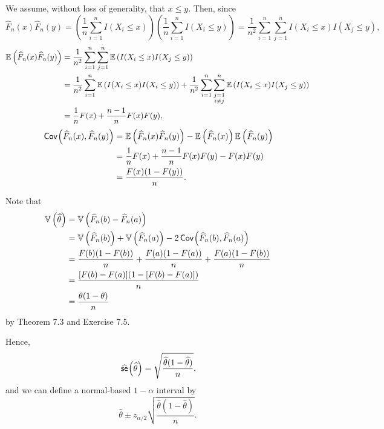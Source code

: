 \begin{ex}
  We assume, without loss of generality, that $x\leq y$. Then, since
  \[
    \widehat{F}_n(x)\widehat{F}_n(y)
    =\left(\frac{1}{n}\sum_{i=1}^nI(X_i\leq x)\right)
    \left(\frac{1}{n}\sum_{i=1}^nI(X_i\leq y)\right)
    =\frac{1}{n^2}\sum_{i=1}^n\sum_{j=1}^nI(X_i\leq x)I(X_j\leq y),
  \]
  \begin{align*}
    \mathbb{E}\left(\widehat{F}_n(x)\widehat{F}_n(y)\right)
     & =\frac{1}{n^2}
    \sum_{i=1}^n\sum_{j=1}^n\mathbb{E}\left(I(X_i\leq x)I(X_j\leq y)\right)      \\
     & =\frac{1}{n^2}\sum_{i=1}^n\mathbb{E}\left(I(X_i\leq x)I(X_i\leq y)\right)
    +\frac{1}{n^2}\sum_{i=1}^n\sum_{\substack{j=1             \\ i\neq j}}^n\mathbb{E}\left(I(X_i\leq x)I(X_j\leq y)\right) \\
     & =\frac{1}{n}F(x)+\frac{n-1}{n}F(x)F(y),
  \end{align*}
  \begin{align*}
    \,\textsf{Cov}\mkern-2mu\left(\widehat{F}_n(x),\widehat{F}_n(y) \right)
     & =\mathbb{E}\left(\widehat{F}_n(x)\widehat{F}_n(y)\right)
    -\mathbb{E}\left(\widehat{F}_n(x)\right)\mathbb{E}\left(\widehat{F}_n(y)\right) \\
     & =\frac{1}{n}F(x)+\frac{n-1}{n}F(x)F(y)
    -F(x)F(y)                                 \\
     & =\frac{F(x)(1-F(y))}{n}.
  \end{align*}
\end{ex}

\begin{ex}
  Note that
  \begin{align*}
    \mathbb{V}\left(\widehat{\theta}\right)
     & =\mathbb{V}\left(\widehat{F}_n(b)-\widehat{F}_n(a)\right)                                                \\
     & =\mathbb{V}\left(\widehat{F}_n(b)\right)+\mathbb{V}\left(\widehat{F}_n(a)\right)-2\,\textsf{Cov}\mkern-2mu\left(\widehat{F}_n(b),\widehat{F}_n(a) \right) \\
     & =\frac{F(b)(1-F(b))}{n}
    +\frac{F(a)(1-F(a))}{n}
    +\frac{F(a)(1-F(b))}{n}                                                                    \\
     & =\frac{[F(b)-F(a)](1-[F(b)-F(a)])}{n}                                                   \\
     & =\frac{\theta(1-\theta)}{n}
  \end{align*}
  by Theorem 7.3 and Exercise 7.5.

  Hence,
  \[
    \,\widehat{\textsf{se}}\mkern-2mu\left(\widehat{\theta} \right)
    =\sqrt{\frac{\widehat{\theta}(1-\widehat{\theta})}{n}},
  \]
  and we can define a normal-based $1-\alpha$ interval by
  \[
    \widehat{\theta}\pm z_{\alpha/2}
    \sqrt{\frac{\widehat{\theta}(1-\widehat{\theta})}{n}}.
  \]
\end{ex}

